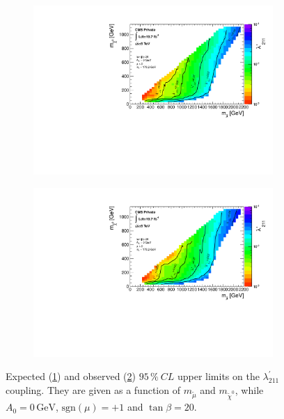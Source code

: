 \begin{figure}[!htbp]
  \centering
  \begin{subfigure}[b]{0.90\textwidth}
    \centering
    \includegraphics[width=\textwidth]{plots/plot_smuon_neutralino_mass_expectedLimitsCombine.pdf}
    \caption{\label{fig:m-smu-nt0-exp}}
  \end{subfigure}
  \begin{subfigure}[b]{0.90\textwidth}
    \centering
    \includegraphics[width=\textwidth]{plots/plot_smuon_neutralino_mass_LimitsCombine.pdf}
    \caption{\label{fig:m-smu-nt0-obs}}
  \end{subfigure}
  \caption{Expected (\ref{fig:m-smu-nt0-exp}) and observed (\ref{fig:m-smu-nt0-obs}) $95\,\%\: CL$ upper limits on the $\lambda^{\prime}_{211}$ coupling. They are given as a function of $m_{\tilde{\mu}}$ and $m_{\tilde{\chi}^0}$, while $A_0 = 0\,\text{GeV}$, $\text{sgn}(\mu) = +1$ and $\tan{\beta} = 20$.}
  \label{fig:smu-nt0-limits}
\end{figure}


